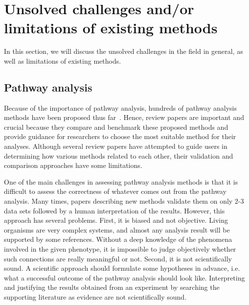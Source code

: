
\section{Unsolved challenges and/or limitations of existing methods}
\label{chap:ExisingMethodsLimitation}

In this section, we will discuss the unsolved challenges in the field in general, as well as limitations of existing methods.

\subsection{Pathway analysis}

Because of the importance of pathway analysis, hundreds of pathway analysis methods have been proposed thus far~\cite{DraghiciOntologicalToolsReview:2005,Khatri:2002,mitrea2013methods}.
Hence, review papers are important and crucial because they compare and benchmark these proposed methods and provide guidance for researchers to choose the most suitable method for their analyses.
Although several review papers have attempted to guide users in determining how various methods related to each other, their validation and comparison approaches have some limitations.

One of the main challenges in assessing pathway analysis methods is that it is difficult to assess the correctness of whatever comes out from the pathway analysis. Many times, papers describing new methods validate them on only 2-3 data sets followed by a human interpretation of the results.
However, this approach has several problems. First, it is biased and not objective. Living organisms are very complex systems, and almost any  analysis result will be supported by some references. Without a deep knowledge of the phenomena involved in the given phenotype, it is impossible to judge objectively whether such connections are really meaningful or not. Second, it is not scientifically sound. A scientific approach should formulate some hypotheses in advance, i.e. what a successful outcome of the pathway analysis should look like. Interpreting and justifying the results obtained from an experiment by searching the supporting literature as evidence are not scientifically sound.

